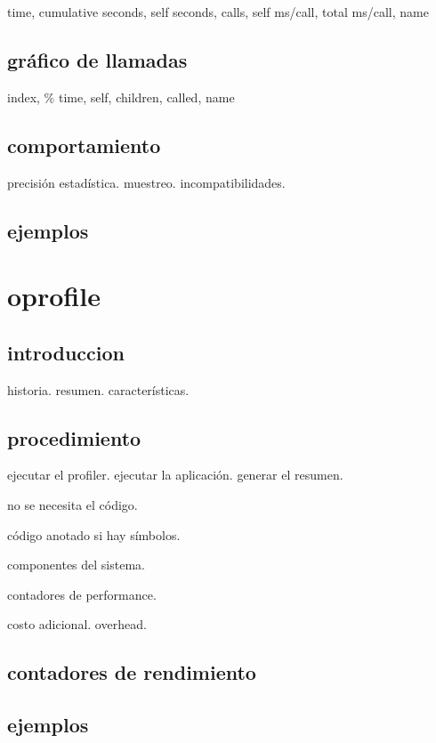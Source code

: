 \documentclass[a4paper]{report}
\begin{document}
time, cumulative seconds, self seconds, calls, self ms/call, total ms/call, name

\subsection{gr\'afico de llamadas}

index, \% time, self, children, called, name

\subsection{comportamiento}

precisi\'on estad\'istica. muestreo. incompatibilidades.

\subsection{ejemplos}

\section{oprofile}

\subsection{introduccion}

historia. resumen. caracter\'isticas. 

\subsection{procedimiento}

ejecutar el profiler. ejecutar la aplicaci\'on. generar el resumen.

no se necesita el c\'odigo.

c\'odigo anotado si hay s\'imbolos.

componentes del sistema.

contadores de performance.

costo adicional. overhead.

\subsection{contadores de rendimiento}

\subsection{ejemplos}
\end{document}
